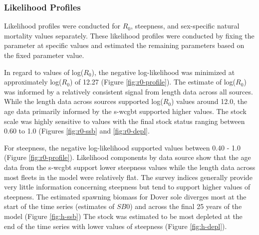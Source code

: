 \documentclass[11pt,
  english,
  a4paper,
]{article}
\begin{document}
\leavevmode\tagmcend\tagstructend\par


\hypertarget{likelihood-profiles}{%
\subsubsection{Likelihood Profiles}\label{likelihood-profiles}}

\leavevmode\tagmcend\tagstructend


Likelihood profiles were conducted for {\(R_0\)\leavevmode\tagmcend\tagstructend}, steepness, and sex-specific natural mortality values separately. These likelihood profiles were conducted by fixing the parameter at specific values and estimated the remaining parameters based on the fixed parameter value.

\leavevmode\tagmcend\tagstructend\par


In regard to values of log({\(R_0\)\leavevmode\tagmcend\tagstructend}), the negative log-likelihood was minimized at approximately log({\(R_0\)\leavevmode\tagmcend\tagstructend}) of 12.27 (Figure \ref{fig:r0-profile}). The estimate of log({\(R_0\)\leavevmode\tagmcend\tagstructend}) was informed by a relatively consistent signal from length data across all sources. While the length data across sources supported log({\(R_0\)\leavevmode\tagmcend\tagstructend}) values around 12.0, the age data primarily informed by the \gls{s-wcgbt} supported higher values. The stock scale was highly sensitive to values with the final stock status ranging between 0.60 to 1.0 (Figures \ref{fig:r0-ssb} and \ref{fig:r0-depl}.

\leavevmode\tagmcend\tagstructend\par


For steepness, the negative log-likelihood supported values between 0.40 - 1.0 (Figure \ref{fig:r0-profile}). Likelihood components by data source show that the age data from the \gls{s-wcgbt} support lower steepness values while the length data across most fleets in the model were relatively flat. The survey indices generally provide very little information concerning steepness but tend to support higher values of steepness. The estimated spawning biomass for Dover sole diverges most at the start of the time series (estimates of {\(SB0\)\leavevmode\tagmcend\tagstructend}) and across the final 25 years of the model (Figure \ref{fig:h-ssb}) The stock was estimated to be most depleted at the end of the time series with lower values of steepness (Figure \ref{fig:h-depl}).
\end{document}
